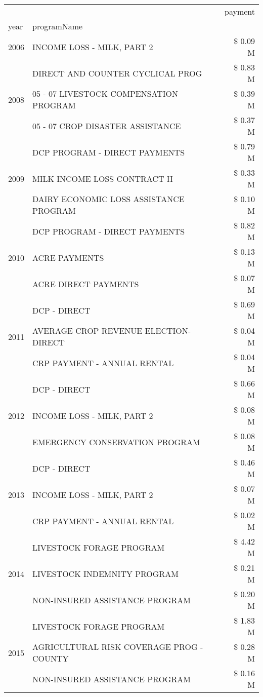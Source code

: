 \begin{tabular}{llr}
\toprule
 &  & payment \\
year & programName &  \\
\midrule
2006 & INCOME LOSS - MILK, PART 2 & \$ 0.09 M \\
\cline{1-3}
\multirow[t]{3}{*}{2008} & DIRECT AND COUNTER CYCLICAL PROG & \$ 0.83 M \\
 & 05 - 07 LIVESTOCK COMPENSATION PROGRAM & \$ 0.39 M \\
 & 05 - 07 CROP DISASTER ASSISTANCE & \$ 0.37 M \\
\cline{1-3}
\multirow[t]{3}{*}{2009} & DCP PROGRAM - DIRECT PAYMENTS & \$ 0.79 M \\
 & MILK INCOME LOSS CONTRACT II & \$ 0.33 M \\
 & DAIRY ECONOMIC LOSS ASSISTANCE PROGRAM & \$ 0.10 M \\
\cline{1-3}
\multirow[t]{3}{*}{2010} & DCP PROGRAM - DIRECT PAYMENTS & \$ 0.82 M \\
 & ACRE PAYMENTS & \$ 0.13 M \\
 & ACRE DIRECT PAYMENTS & \$ 0.07 M \\
\cline{1-3}
\multirow[t]{3}{*}{2011} & DCP - DIRECT & \$ 0.69 M \\
 & AVERAGE CROP REVENUE ELECTION-DIRECT & \$ 0.04 M \\
 & CRP PAYMENT - ANNUAL RENTAL & \$ 0.04 M \\
\cline{1-3}
\multirow[t]{3}{*}{2012} & DCP - DIRECT & \$ 0.66 M \\
 & INCOME LOSS - MILK, PART 2 & \$ 0.08 M \\
 & EMERGENCY CONSERVATION PROGRAM & \$ 0.08 M \\
\cline{1-3}
\multirow[t]{3}{*}{2013} & DCP - DIRECT & \$ 0.46 M \\
 & INCOME LOSS - MILK, PART 2 & \$ 0.07 M \\
 & CRP PAYMENT - ANNUAL RENTAL & \$ 0.02 M \\
\cline{1-3}
\multirow[t]{3}{*}{2014} & LIVESTOCK FORAGE PROGRAM & \$ 4.42 M \\
 & LIVESTOCK INDEMNITY PROGRAM & \$ 0.21 M \\
 & NON-INSURED ASSISTANCE PROGRAM & \$ 0.20 M \\
\cline{1-3}
\multirow[t]{3}{*}{2015} & LIVESTOCK FORAGE PROGRAM & \$ 1.83 M \\
 & AGRICULTURAL RISK COVERAGE PROG - COUNTY & \$ 0.28 M \\
 & NON-INSURED ASSISTANCE PROGRAM & \$ 0.16 M \\

\end{tabular}

